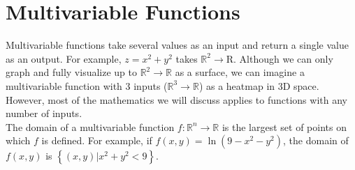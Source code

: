 \section{Multivariable Functions}
\noindent
Multivariable functions take several values as an input and return a single value as an output.
For example, $ z =x^2 + y^2$ takes $\mathbb{R}^2 \to \mathrm{R}$.
Although we can only graph and fully visualize up to $\mathbb{R}^2 \to \mathbb{R}$ as a surface, we can imagine a multivariable function with 3 inputs ($\mathbb{R}^3 \to \mathbb{R}$) as a heatmap in 3D space. However, most of the mathematics we will discuss applies to functions with any number of inputs.\\

\noindent
The domain of a multivariable function $f: \mathbb{R}^n \to \mathbb{R}$ is the largest set of points on which $f$ is defined.
For example, if $f(x,y) = \ln{\left(9-x^2-y^2\right)}$, the domain of $f(x,y)$ is $\left\{ (x,y) | x^2+y^2<9 \right\}$.
